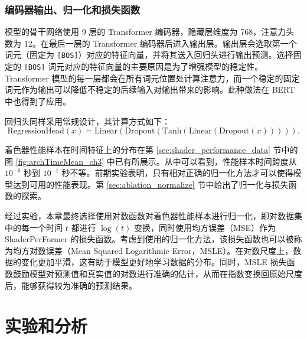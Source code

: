 \subsubsection{编码器输出、归一化和损失函数}

{} 模型的骨干网络使用 9 层的 Transformer 编码器，隐藏层维度为 768，注意力头数为 12。在最后一层的 Transformer 编码器后进入输出层。输出层会选取第一个词元（固定为 \verb|[BOS]|）对应的特征向量，并将其送入回归头进行输出预测。选择固定的 \verb|[BOS]| 词元对应的特征向量的主要原因是为了增强模型的稳定性。Transformer 模型的每一层都会在所有词元位置处计算注意力，而一个稳定的固定词元作为输出可以降低不稳定的后续输入对输出带来的影响。此种做法在 BERT \cite{devlin-etal-2019-bert}中也得到了应用。

{\amend 回归头同样采用常规设计，}其计算方式如下：
\begin{equation}
    \label{eq:reg_head}
    \text{RegressionHead}(x) = \text{Linear}(\text{Dropout}(\text{Tanh}(\text{Linear}(\text{Dropout}(x))))).
\end{equation}

{ 着色器性能样本在时间特征上的分布在第 \ref{sec:shader_performance_data} 节中的图 \ref{fig:archTimeMean_ch3} 中已有所展示。从中可以看到，}性能样本时间跨度从 $10^{-6}$ 秒到 $10^{-1}$ 秒不等。{\amend 前期实验表明，只有相对正确的归一化方法才可以使得模型达到可用的性能表现。第 \ref{sec:ablation_normalize} 节中给出了归一化与损失函数的探索。}

{\amend 经过实验，}本章最终选择使用对数函数对着色器性能样本进行归一化，即对数据集中的每一个时间 $t$ 都进行 $\log(t)$ 变换，同时使用均方误差（MSE）作为 ShaderPerFormer 的损失函数。考虑到使用的归一化方法，该损失函数也可以被称为均方对数误差（Mean Squared Logarithmic Error，MSLE）。在对数尺度上，数据的变化更加平滑，这有助于模型更好地学习数据的分布。同时，MSLE 损失函数鼓励模型对预测值和真实值的对数进行准确的估计，从而在指数变换回原始尺度后，能够获得较为准确的预测结果。

\section{{\amend 实验和分析}}


